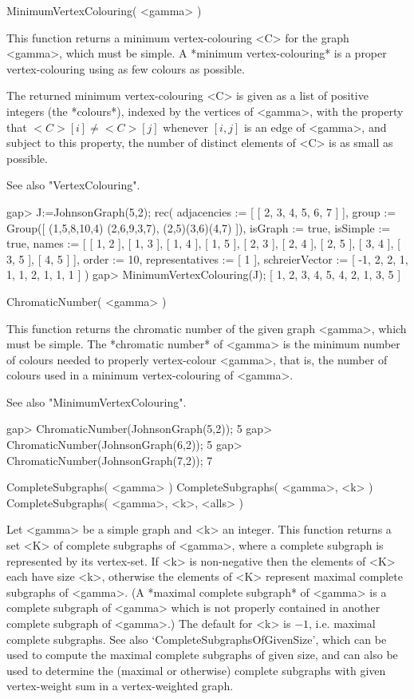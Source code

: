 
\>MinimumVertexColouring( <gamma> )

This function returns a minimum vertex-colouring <C> for the graph
<gamma>, which must be simple. A *minimum vertex-colouring*
is a proper vertex-colouring using as few colours as possible.

The returned minimum vertex-colouring <C> is given as a list of positive
integers (the *colours*), indexed by the vertices of <gamma>, with the
property that $<C>[i]\not=<C>[j]$ whenever $[i,j]$ is an edge of <gamma>,
and subject to this property, the number of distinct elements of <C>
is as small as possible.

See also "VertexColouring".

\beginexample
gap> J:=JohnsonGraph(5,2);
rec( adjacencies := [ [ 2, 3, 4, 5, 6, 7 ] ], group := Group([ (1,5,8,10,4)
  (2,6,9,3,7), (2,5)(3,6)(4,7) ]), isGraph := true, isSimple := true, 
  names := [ [ 1, 2 ], [ 1, 3 ], [ 1, 4 ], [ 1, 5 ], [ 2, 3 ], [ 2, 4 ], 
      [ 2, 5 ], [ 3, 4 ], [ 3, 5 ], [ 4, 5 ] ], order := 10, 
  representatives := [ 1 ], schreierVector := [ -1, 2, 2, 1, 1, 1, 2, 1, 1, 1 
     ] )
gap> MinimumVertexColouring(J);
[ 1, 2, 3, 4, 5, 4, 2, 1, 3, 5 ]
\endexample


\>ChromaticNumber( <gamma> )

This function returns the chromatic number of the given graph <gamma>,
which must be simple.  The *chromatic number*
of <gamma> is the minimum number of colours needed to properly vertex-colour
<gamma>, that is, the number of colours used in a minimum vertex-colouring
of <gamma>.

See also "MinimumVertexColouring".

\beginexample
gap> ChromaticNumber(JohnsonGraph(5,2));
5
gap> ChromaticNumber(JohnsonGraph(6,2));
5
gap> ChromaticNumber(JohnsonGraph(7,2));
7
\endexample


\>CompleteSubgraphs( <gamma> )
\>CompleteSubgraphs( <gamma>, <k> )
\>CompleteSubgraphs( <gamma>, <k>, <alls> )

Let <gamma> be a simple graph and <k> an integer. This function returns
a set <K> of complete subgraphs of <gamma>, where a complete subgraph is
represented by its vertex-set.  If <k> is non-negative then the elements
of <K> each have size <k>, otherwise the elements of <K> represent maximal
complete subgraphs of <gamma>. (A *maximal complete subgraph* of <gamma>
is a complete subgraph of <gamma> which is not properly contained in
another complete subgraph of <gamma>.) The default for <k> is $-1$,
i.e. maximal complete subgraphs.  See also `CompleteSubgraphsOfGivenSize',
which can be used to compute the maximal complete subgraphs of given
size, and can also be used to determine the (maximal or otherwise)
complete subgraphs with given vertex-weight sum in a vertex-weighted
graph.

